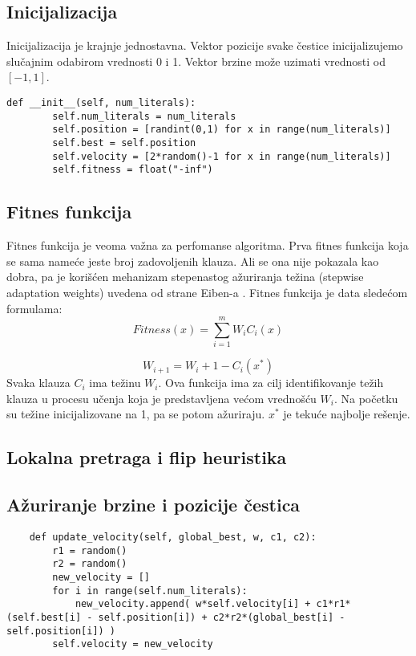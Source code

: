 \documentclass{article}
\begin{document}
\subsection{Inicijalizacija}
Inicijalizacija je krajnje jednostavna. Vektor pozicije svake čestice inicijalizujemo slučajnim odabirom vrednosti 0 i 1.  Vektor brzine može uzimati vrednosti od $[-1,1]$.

\begin{lstlisting}
def __init__(self, num_literals):
        self.num_literals = num_literals
        self.position = [randint(0,1) for x in range(num_literals)]
        self.best = self.position
        self.velocity = [2*random()-1 for x in range(num_literals)]
        self.fitness = float("-inf")
\end{lstlisting}

\subsection{Fitnes funkcija}
Fitnes funkcija je veoma važna za perfomanse algoritma.
Prva fitnes funkcija koja se sama nameće jeste broj zadovoljenih klauza. Ali se ona nije pokazala kao dobra, pa je korišćen mehanizam stepenastog ažuriranja težina (stepwise adaptation weights) uvedena od strane Eiben-a \cite{fitnes}.
Fitnes funkcija je data sledećom formulama:
$$ Fitness(x) = \sum_{i=1}^{m} W_iC_i(x)$$

$$ W_{i+1} = W_{i} + 1 - C_i(x^*) $$
Svaka klauza $C_i$ ima težinu $W_i$. Ova funkcija ima za cilj identifikovanje težih klauza u procesu učenja koja je predstavljena većom vrednošću $W_i$. Na početku su težine inicijalizovane na 1, pa se potom ažuriraju.
$x^*$ je tekuće najbolje rešenje.


\subsection{Lokalna pretraga i flip heuristika}
 
\subsection{Ažuriranje brzine i pozicije čestica}
\begin{lstlisting}
    def update_velocity(self, global_best, w, c1, c2):
        r1 = random()
        r2 = random()
        new_velocity = []
        for i in range(self.num_literals):
            new_velocity.append( w*self.velocity[i] + c1*r1*(self.best[i] - self.position[i]) + c2*r2*(global_best[i] - self.position[i]) )
        self.velocity = new_velocity
\end{lstlisting}
\end{document}
